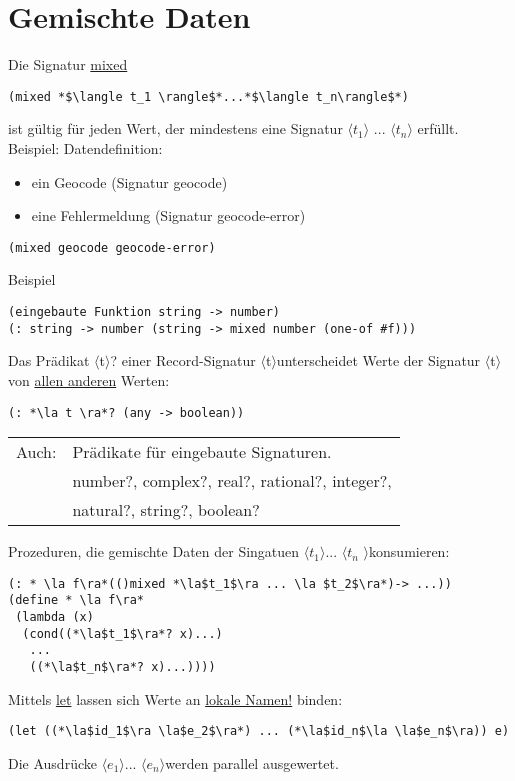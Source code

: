 \documentclass[a4paper,12pt]{article}
\newcommand{\la}{$\langle$}
\newcommand{\ra}{$\rangle$}
\begin{document}
\section{Gemischte Daten}
Die Signatur \uline{mixed}
\begin{lstlisting}[style=customc]
(mixed *$\langle t_1 \rangle$*...*$\langle t_n\rangle$*)
\end{lstlisting}
ist gültig für jeden Wert, der mindestens eine Signatur $\langle t_1 \rangle$ ... $\langle t_n\rangle$ erfüllt.\\
Beispiel: Datendefinition:
\begin{itemize}
\item ein Geocode (Signatur geocode)
\item eine Fehlermeldung (Signatur geocode-error)
\end{itemize}
\begin{lstlisting}[style=customc]
(mixed geocode geocode-error)
\end{lstlisting}
Beispiel \begin{lstlisting}[style=customc]
(eingebaute Funktion string -> number)
(: string -> number (string -> mixed number (one-of #f)))
\end{lstlisting}
Das Prädikat \la t\ra? einer Record-Signatur \la t\ra  unterscheidet Werte der Signatur \la t\ra von \uline{allen anderen} Werten:\\
\begin{lstlisting}[style=customc]
(: *\la t \ra*? (any -> boolean))
\end{lstlisting}
\begin{tabular}{ll}
Auch: & Prädikate für eingebaute Signaturen.\\
 & number?, complex?, real?, rational?, integer?,\\ 
 & natural?, string?, boolean?
\end{tabular}
Prozeduren, die gemischte Daten der Singatuen \la $t_1$\ra ... \la $t_n $ \ra konsumieren:
\begin{lstlisting}[style=customc]
(: * \la f\ra*(()mixed *\la$t_1$\ra ... \la $t_2$\ra*)-> ...))
(define * \la f\ra*
 (lambda (x)
  (cond((*\la$t_1$\ra*? x)...)
   ...
   ((*\la$t_n$\ra*? x)...))))
\end{lstlisting}
Mittels \uline{let} lassen sich Werte an \uline{lokale Namen!} binden:
\begin{lstlisting}[style=customc]
(let ((*\la$id_1$\ra \la$e_2$\ra*) ... (*\la$id_n$\la \la$e_n$\ra)) e)
\end{lstlisting}
Die Ausdrücke \la $e_1$\ra ... \la$e_n$\ra werden parallel ausgewertet. 
\end{document}
